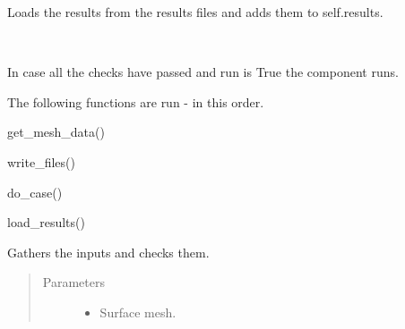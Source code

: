 \documentclass[letterpaper,10pt,english]{sphinxmanual}
\begin{document}
\begin{fulllineitems}
\begin{fulllineitems}
\end{fulllineitems}


\begin{fulllineitems}
\label{\detokenize{comfort:livestock.components.air.NewAirConditions.load_results}}
Loads the results from the results files and adds them to self.results.

\end{fulllineitems}


\begin{fulllineitems}
\label{\detokenize{comfort:livestock.components.air.NewAirConditions.run}}~
\begin{DUlineblock}{0em}
\item[] In case all the checks have passed and run is True the component runs.
\item[] The following functions are run - in this order.
\item[] get\_mesh\_data()
\item[] write\_files()
\item[] do\_case()
\item[] load\_results()
\end{DUlineblock}

\end{fulllineitems}


\begin{fulllineitems}
\label{\detokenize{comfort:livestock.components.air.NewAirConditions.run_checks}}
Gathers the inputs and checks them.
\begin{quote}\begin{description}
\item[{Parameters}] \leavevmode\begin{itemize}
\item {} 
 \textendash{} Surface mesh.


\end{itemize}
\end{description}
\end{quote}
\end{fulllineitems}
\end{fulllineitems}
\end{document}

